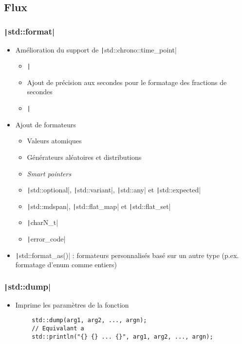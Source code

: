 \documentclass[C++.tex]{subfiles}
\begin{document}
\subsection*{Flux}
\begin{frame}[fragile]
	\frametitle{\texttt|std::format|}
	\begin{itemize}
		\item Amélioration du support de \texttt|std::chrono::time_point|
		\begin{itemize}
			\item \texttt|%
			\item Ajout de précision aux secondes pour le formatage des fractions de secondes
			\item \texttt|%
		\end{itemize}
		\item Ajout de formateurs
		\begin{itemize}
			\item Valeurs atomiques
			\item Générateurs aléatoires et distributions
			\item \textit{Smart pointers}
			\item \texttt|std::optional|, \texttt|std::variant|, \texttt|std::any| et \texttt|std::expected|
			\item \texttt|std::mdspan|, \texttt|std::flat_map| et \texttt|std::flat_set|
			\item \texttt|charN_t|
			\item \texttt|error_code|
		\end{itemize}
		\item \texttt|std::format_as()| : formateurs personnalisés basé sur un autre type (p.ex. formatage d'enum comme entiers)
	\end{itemize}

\end{frame}

\begin{frame}[fragile]
	\frametitle{\texttt|std::dump|}
	\begin{itemize}
		\item Imprime les paramètres de la fonction
	\end{itemize}

	\begin{verbatim}
		std::dump(arg1, arg2, ..., argn);
		// Equivalant a
		std::println("{} {} ... {}", arg1, arg2, ..., argn);
	\end{verbatim}
\end{frame}
\end{document}
